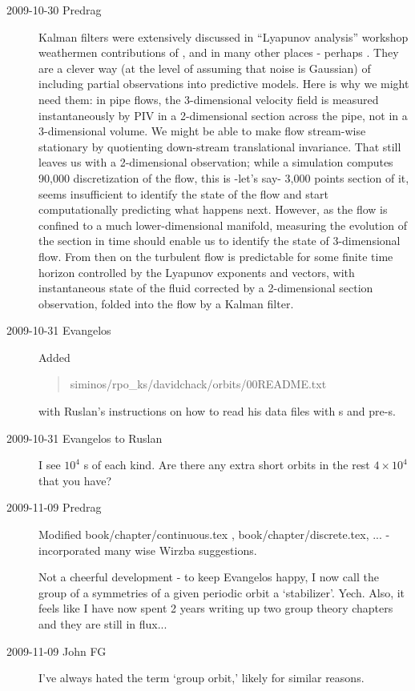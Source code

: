 \begin{description}
\item[2009-10-30 Predrag] Kalman filters were extensively
    discussed in ``Lyapunov analysis'' workshop weathermen
contributions of , and in many
other places - perhaps . They are a clever way
(at the level of assuming that noise is Gaussian) of
including partial observations into predictive models. Here
is why we might need them: in pipe flows, the 3-dimensional
velocity field is measured instantaneously by PIV in a
2-dimensional section across the pipe, not in a
3-dimensional volume. We might be able to make flow
stream-wise stationary by quotienting down-stream
translational invariance. That still leaves us with a
2-dimensional observation; while a simulation computes
90,000 discretization of the flow, this is -let's say-
3,000 points section of it, seems insufficient to identify
the state of the flow and start computationally predicting
what happens next. However, as the flow is confined to a
much lower-dimensional manifold, measuring the evolution of
the section in time should enable us to identify the state
of 3-dimensional flow. From then on the turbulent flow is
predictable for some finite time horizon controlled by the
Lyapunov exponents and vectors, with instantaneous state of
the fluid corrected by a 2-dimensional section observation,
folded into the flow by a Kalman filter.

\item[2009-10-31 Evangelos] Added
\begin{quote}
    siminos/rpo\_ks/davidchack/orbits/00README.txt
\end{quote}
    with Ruslan's instructions on how to read his data
    files with \rpo s and pre-\po s.

\item[2009-10-31 Evangelos to Ruslan] I see $10^4$ \rpo s
    of each kind. Are there any extra short orbits in the
    rest $4 \times 10^4$ that you have?

\item[2009-11-09 Predrag]
Modified
  book/chapter/continuous.tex ,
  book/chapter/discrete.tex, ...
- incorporated many wise Wirzba suggestions.

Not a cheerful development - to keep Evangelos happy, I now call the
 group of a symmetries of a given periodic orbit a `stabilizer'. Yech.
 Also, it feels like I have now spent 2 years writing up two group theory
 chapters and they are still in flux...

\item[2009-11-09 John FG]
    I've always hated the term `group orbit,' likely for similar reasons.


\end{description}
